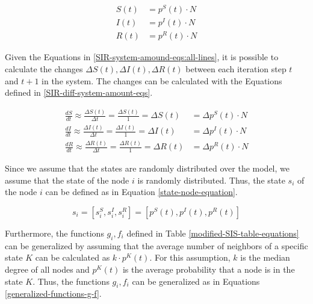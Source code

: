 \begin{subequations}
\begin{align}
    S(t) &=p^S(t)\cdot N \label{SIR-system-amound-eqs:1}\\
    I(t) &=p^I(t)\cdot N \label{SIR-system-amound-eqs:2}\\
    R(t) &=p^R(t)\cdot N \label{SIR-system-amound-eqs:3}
\end{align}
\label{SIR-system-amound-eqs:all-lines}
\end{subequations}

Given the Equations in \ref{SIR-system-amound-eqs:all-lines}, it is possible 
to calculate the changes $\Delta S(t), \Delta I(t), \Delta R(t)$ between each 
iteration step $t$ and $t+1$ in the system.
The changes can be calculated with the Equations defined in 
\ref{SIR-diff-system-amount-eqs}.

\begin{subequations}
\begin{align}
    \frac{dS}{dt} \approx \frac{\Delta S(t)}{\Delta t} = \frac{\Delta S(t)}{1} = \Delta S(t) &=\Delta p^S(t)\cdot N \label{SIR-diff-system-amount-eqs:1}\\
    \frac{dI}{dt} \approx \frac{\Delta I(t)}{\Delta t} = \frac{\Delta I(t)}{1} = \Delta I(t) &=\Delta p^I(t)\cdot N \label{SIR-diff-system-amount-eqs:2}\\
    \frac{dR}{dt} \approx \frac{\Delta R(t)}{\Delta t} = \frac{\Delta R(t)}{1} = \Delta R(t) &=\Delta p^R(t)\cdot N \label{SIR-diff-system-amount-eqs:3}
\end{align}
\label{SIR-diff-system-amount-eqs}
\end{subequations}

Since we assume that the states are randomly distributed over the model, 
we assume that the state of the node $i$ is randomly distributed.
Thus, the state $s_i$ of the node $i$ can be defined as in Equation 
\ref{state-node-equation}.

\begin{equation}
    s_i = [s_i^S, s_i^I, s_i^R] = [p^S(t), p^I(t), p^R(t)]
    \label{state-node-equation}
\end{equation}

Furthermore, the functions $g_i,f_i$ defined in Table 
\ref{modified-SIS-table-equations}
can be generalized by assuming that the average number of neighbors 
of a specific state $K$ can be calculated as $k\cdot p^K(t)$. For this
assumption, $k$ is the median degree of all nodes and $p^K(t)$ is the 
average probability that a node is in the state $K$.
Thus, the functions $g_i,f_i$ can be generalized as in
Equations \ref{generalized-functions-g-f}.

